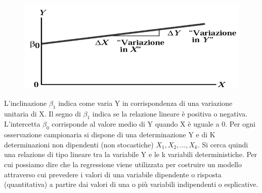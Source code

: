 \documentclass[a4paper,12pt,titlepage,oneside,openany]{book}
\begin{document}
\begin{figure}[H]
	\centering	\includegraphics[scale=0.5]{regression.png}
	\label{fig:regression}
\end{figure}
L'inclinazione 
\begin{math}
	\beta_{1}
\end{math}
indica come varia Y in corrispondenza di una variazione unitaria di X. Il segno di \begin{math} \beta_{1} \end{math} indica se la relazione lineare è positiva o negativa.
L’intercetta \begin{math} \beta_{0} \end{math} corrisponde al valore medio di Y quando X è uguale a 0.
Per ogni osservazione campionaria si dispone di una determinazione Y e di K determinazioni non dipendenti (non stocastiche) \begin{math} X_{1},X_{2},...,X_{k} \end{math}. Si cerca quindi una relazione di tipo lineare tra la variabile Y e le k variabili deterministiche. Per cui possiamo dire che la regressione viene utilizzata per costruire un modello attraverso cui prevedere i valori di una variabile dipendente o risposta (quantitativa) a partire dai valori di una o più variabili indipendenti o esplicative.
\end{document}
